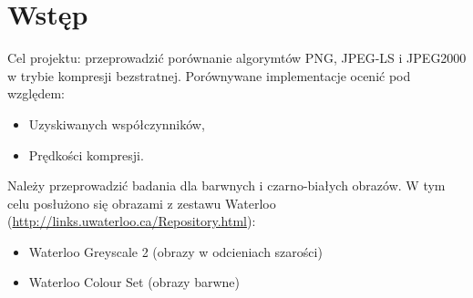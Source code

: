 \section{Wstęp}

Cel projektu: przeprowadzić porównanie algorymtów PNG, JPEG-LS i JPEG2000 w trybie kompresji bezstratnej. Porównywane implementacje ocenić pod względem:

\begin{itemize}
	\item Uzyskiwanych współczynników,
	\item Prędkości kompresji.
\end{itemize}

Należy przeprowadzić badania dla barwnych i czarno-białych obrazów. W tym celu posłużono się obrazami z zestawu Waterloo (\url{http://links.uwaterloo.ca/Repository.html}):

\begin{itemize}
	\item Waterloo Greyscale 2 (obrazy w odcieniach szarości)
	\item Waterloo Colour Set (obrazy barwne)
\end{itemize}